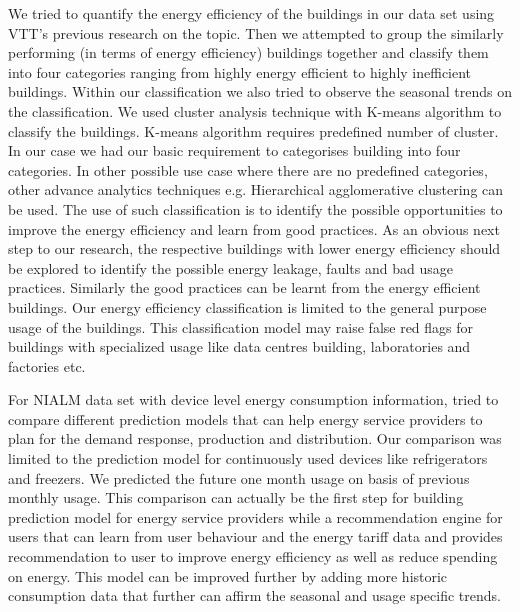 We tried to quantify the energy efficiency of the buildings in our data set using VTT's previous research on the topic. Then we attempted to group the similarly performing (in terms of energy efficiency) buildings together and classify them into four categories ranging from highly energy efficient to highly inefficient buildings. Within our classification we also tried to observe the seasonal trends on the classification. We used cluster analysis technique with K-means algorithm to classify the buildings. K-means algorithm requires predefined number of cluster. In our case we had our basic requirement to categorises building into four categories. In other possible use case where there are no predefined categories, other advance analytics techniques e.g. Hierarchical agglomerative clustering can be used. The use of such classification is to identify the possible opportunities to improve the energy efficiency and learn from good practices. As an obvious next step to our research, the respective buildings with lower energy efficiency should be explored to identify the possible energy leakage, faults and bad usage practices. Similarly the good practices can be learnt from the energy efficient buildings. Our energy efficiency classification is limited to the general purpose usage of the buildings. This classification model may raise false red flags for buildings with specialized usage like data centres building, laboratories and factories etc. 

For NIALM data set with device level energy consumption information, tried to compare different prediction models that can help energy service providers to plan for the demand response, production and distribution. Our comparison was limited to the prediction model for continuously used devices like refrigerators and freezers. We predicted the future one month usage on basis of previous monthly usage. This comparison can actually be the first step for building prediction model for energy service providers while a recommendation engine for users that can learn from user behaviour and the energy tariff data and provides recommendation to user to improve energy efficiency as well as reduce spending on energy. This model can be improved further by adding more historic consumption data that further can affirm the seasonal and usage specific trends.    